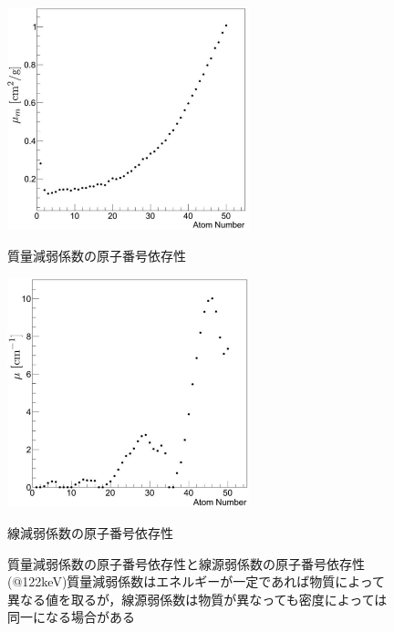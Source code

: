 \begin{figure}[H]
 \begin{minipage}{0.52\hsize}
  \begin{center}
   \includegraphics[width=7cm]{image/other/mass_atten.eps}
  \end{center}
   \vspace{-0.5cm}
    \caption*{質量減弱係数の原子番号依存性}
 \end{minipage}
 \begin{minipage}{0.52\hsize}
  \begin{center}
   \includegraphics[width=7cm]{image/other/linear_atten.eps}
  \end{center}
     \vspace{-0.5cm}
   \caption*{線減弱係数の原子番号依存性}
 \end{minipage}
 \begin{center}
  \vspace{-1zh}
  \caption{質量減弱係数の原子番号依存性と線源弱係数の原子番号依存性(@122keV)\newline 質量減弱係数はエネルギーが一定であれば物質によって異なる値を取るが，線源弱係数は物質が異なっても密度によっては同一になる場合がある}
  \label{fig:atten}
  \end{center}
\end{figure}



